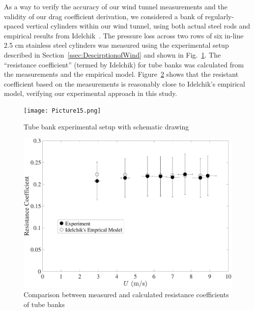 \documentclass[12pt]{article}
\begin{document}
As a way to verify the accuracy of our wind tunnel measurements and the validity of our drag coefficient derivation, we considered a bank of regularly-spaced vertical cylinders within our wind tunnel, using both actual steel rods and empirical results from Idelchik~\cite{Idelchik1994}. The pressure loss across two rows of six in-line 2.5 cm stainless steel cylinders was measured using the experimental setup described in Section~\ref{ssec:DescirptionofWind} and shown in Fig.~\ref{fig:TBES}. The ``resistance coefficient'' (termed by Idelchik) for tube banks was calculated from the measurements and the empirical model. Figure~\ref{fig:RESCOEF} shows that the resistant coefficient based on the measurements is reasonably close to Idelchik's empirical model, verifying our experimental approach in this study.

\begin{figure}[!h]
	\centering
\texttt{[image: Picture15.png]}
	\caption[Tube bank experimental setup]{Tube bank experimental setup with schematic drawing}
	\label{fig:TBES}
\end{figure}

\begin{figure}[!h]
	\centering
    \includegraphics[width=.8\textwidth,keepaspectratio]{Picture14.pdf}
	\caption[Comparison between resistance coefficients of tube banks ]{Comparison between measured and calculated resistance coefficients of tube banks}
	\label{fig:RESCOEF}
\end{figure}
\end{document}
